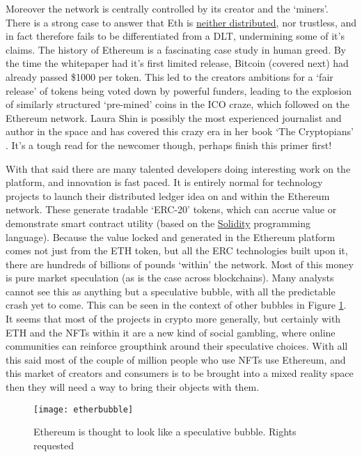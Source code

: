 Moreover the network is centrally controlled by its creator and the `miners'. There is a strong case to answer that Eth is \href{https://blog.mollywhite.net/blockchains-are-not-what-they-say/}{neither distributed}, nor trustless, and in fact therefore fails to be differentiated from a DLT, undermining some of it's claims. The history of Ethereum is a fascinating case study in human greed. By the time the whitepaper had it's first limited release, Bitcoin (covered next) had already passed \$1000 per token. This led to the creators ambitions for a `fair release' of tokens being voted down by powerful funders, leading to the explosion of similarly structured `pre-mined' coins in the ICO craze, which followed on the Ethereum network. Laura Shin is possibly the most experienced journalist and author in the space and has covered this crazy era in her book `The Cryptopians' \cite{cryptopians}. It's a tough read for the newcomer though, perhaps finish this primer first!\par
With that said there are many talented developers doing interesting work on the platform, and innovation is fast paced. It is entirely normal for technology projects to launch their distributed ledger idea on and within the Ethereum network. These generate tradable `ERC-20' tokens, which can accrue value or demonstrate smart contract utility  (based on the \href{https://soliditylang.org/}{Solidity} programming language). Because the value locked and generated in the Ethereum platform comes not just from the ETH token, but all the ERC technologies built upon it, there are hundreds of billions of pounds `within' the network. Most of this money is pure market speculation (as is the case across blockchains). Many analysts cannot see this as anything but a speculative bubble, with all the predictable crash yet to come. This can be seen in the context of other bubbles in Figure \ref{fig:etherbubble}. It seems that most of the projects in crypto more generally, but certainly with ETH and the NFTs within it are a new kind of social gambling, where online communities can reinforce groupthink around their speculative choices. With all this said most of the couple of million people who use NFTs use Ethereum, and this market of creators and consumers is to be brought into a mixed reality space then they will need a way to bring their objects with them. 
\begin{figure}
  \centering
    \texttt{[image: etherbubble]}
  \caption{Ethereum is thought to look like a speculative bubble. Rights requested}
    \label{fig:etherbubble}
\end{figure}

